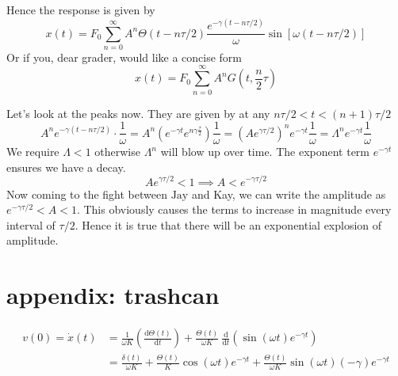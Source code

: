 \documentclass[letterpaper]{article}
\begin{document}
\vspace{0.3cm}
Hence the response is given by 
\[
x(t) = 
F_0 \sum_{n=0}^{\infty} 
A^{n}
\Theta(t - n \tau / 2 ) 
\frac{e^{- \gamma (t- n \tau / 2)}}{\omega}  
\sin\left[\omega (t- n \tau / 2 )\right]
\]
Or if you, dear grader, would like a concise form 
\[
 x(t) = F_0 \sum_{n=0}^{\infty} A^{n} G\left(t, \frac{n}{2} \tau\right)  
\] 

Let's look at the peaks now. They are given by at any $n \tau / 2 < t < (n+1) \tau / 2	$ 
\[
A^{n} e^{- \gamma ( t - n \tau / 2) } \cdot  \frac{1}{ \omega} = 
A^{n} \left(
e^{ - \gamma t} e^{n \gamma \frac{\tau}{2}} \right) \frac{1}{\omega} = 
\left(A e^{ \gamma \tau /2 }\right) ^{n} e^{-\gamma t} \frac{1}{\omega} = 
\Lambda^{n} e^{- \gamma t} \frac{1}{\omega}
\]
We require $\Lambda < 1$ otherwise $\Lambda^{n}$ will blow up over time. The exponent term $e^{- \gamma t}$ ensures we have a decay.  
\[
A e^{ \gamma \tau / 2} < 1 \implies A < {e^{  - \gamma \tau / 2}}
\] 
Now coming to the fight between $\text{Jay}$ and Kay, we can write the amplitude as $e^{- \gamma \tau / 2} < A < 1$. This obviously causes the terms to increase in magnitude every interval of $ \tau / 2$. Hence it is true that there will be an exponential explosion of amplitude. 
\newpage
\section*{appendix: trashcan}

\begin{align*}
v(0) = 	\dot{x}(t) &= \frac{1}{ \omega K} \left( \frac{\mathrm{d} \Theta(t)}{\mathrm{d} t}\right) + \frac{\Theta(t)}{\omega K}  
\ \frac{\mathrm{d} }{\mathrm{d} t} \left(
\sin\left(\omega t\right) e^{- \gamma t}
\right) \\ 
		   &= 
\frac{\delta(t)}{ \omega K} + \frac{\Theta(t)}{ K} \cos(\omega t) e^{- \gamma t} + \frac{\Theta(t)}{ \omega K} \sin(\omega t) (- \gamma)e^{ - \gamma t}
\end{align*} 
\end{document}
